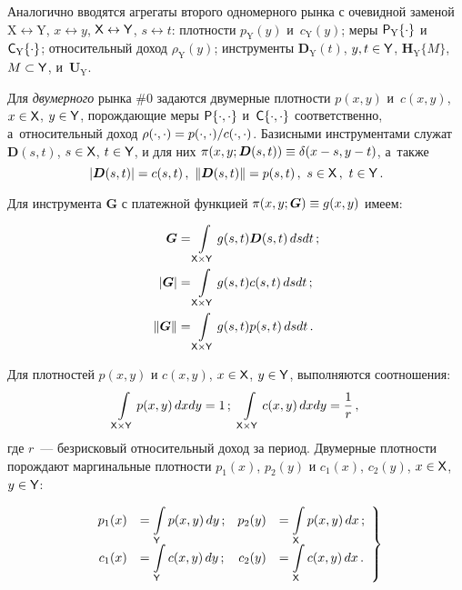 \begin{multicols}{2}
  Аналогично вводятся агрегаты второго одномерного рынка с очевидной 
заменой $\mathrm{X}\leftrightarrow\mathrm{Y}$, $x\leftrightarrow y$, ${\sf 
X}\leftrightarrow {\sf Y}$, $s\leftrightarrow t$: плотности $p_{\mathrm{Y}}(y)$ 
и~$c_{\mathrm{Y}}(y)$; меры ${\sf P}_{\mathrm{Y}}\{\cdot\}$ и~${\sf 
C}_{\mathrm{Y}}\{\cdot\}$; относительный доход $\rho_{\mathrm{Y}}(y)$; 
инструменты $\boldsymbol{D}_{\mathrm{Y}}(t)$, $y, t \hm\in {\sf Y}$, 
$\boldsymbol{H}_{\mathrm{Y}}\{M\}$, $M \hm\subset {\sf Y}$, 
и~$\boldsymbol{U}_{\mathrm{Y}}$.
  
  Для \textit{двумерного} рынка \#0 задаются двумерные плотности $p(x, y)$ 
и~$c(x, y)$, $x \hm\in {\sf  X}$, $y \hm\in {\sf  Y}$, по\-рож\-да\-ющие меры ${\sf 
P}\{\cdot,\cdot\}$ и~${\sf  C}\{\cdot,\cdot\}$ соответственно, а~относительный 
доход $\rho(\cdot,\cdot)\hm = p(\cdot,\cdot)/c(\cdot,\cdot)$. Базисными 
инструментами служат $\boldsymbol{D}(s, t)$, $s \hm\in{\sf X}$, $t\hm\in{\sf  
Y}$, и для них $\pi(x, y; \boldsymbol{D}(s, t))\hm\equiv \delta(x \hm- s, y \hm- t)$, 
а~также 
  $$
  \left\vert \boldsymbol{D}(s,t)\right\vert =c(s,t)\,,\enskip\!
  \left\| \boldsymbol{D}(s,t)\right\| =p(s,t)\,,\enskip\!
  s\in {\sf X}\,,\ t\in {\sf Y}\,.
  $$
  
  Для инструмента $\boldsymbol{G}$ с платежной функцией $\pi(x, y; 
\boldsymbol{G}) \hm\equiv g(x, y)$ имеем: 

\noindent
  \begin{align*}
  \boldsymbol{G} &= \int\limits_{{\sf X}\times{\sf Y}} g(s,t) 
\boldsymbol{D}(s,t)\,dsdt\,;\\
  \vert \boldsymbol{G}\vert &=\int\limits_{{\sf X}\times {\sf Y}} 
g(s,t)c(s,t)\,dsdt\,;\\
\|\boldsymbol{G}\| &=\int\limits_{{\sf 
X}\times{\sf Y}} g(s,t) p(s,t)\,dsdt\,.
  \end{align*}
  
\vspace*{-2pt}
  
  Для плотностей $p(x, y)$ и $c(x, y)$, $x \hm\in{\sf X}$, $y \hm\in{\sf  Y}$, 
выполняются соотношения:
  $$
  \int\limits_{{\sf X}\times{\sf Y}} p(x,y)\,dxdy=1\,;\enskip
  \int\limits_{{\sf X}\times {\sf Y}} c(x,y)\,dxdy=\displaystyle\frac{\displaystyle 1\mathstrut}{\displaystyle r\mathstrut}\,,
  $$
где $r$~--- безрисковый относительный доход за период. Двумерные плотности 
порождают маргинальные плотности $p_1(x)$, $p_2(y)$ и $c_1(x)$, $c_2(y)$, $x 
\hm\in{\sf X}$, $y \hm\in{\sf  Y}$: 

\noindent
\begin{equation}
\left.
\begin{array}{rlrl}
p_1(x) &= \displaystyle\int\limits_{\sf Y} p(x,y)\,dy\,; & p_2(y)&=\displaystyle
 \int\limits_{\sf X} 
p(x,y)\,dx\,;\\[6pt]
     c_1(x) &= \displaystyle\int\limits_{\sf Y} c(x,y)\,dy\,; & c_2(y)&= 
     \displaystyle\int\limits_{\sf X} c(x,y)\,dx\,.
     \end{array}
     \right\}
     \label{e1-ag}
     \end{equation}
     

\end{multicols}
